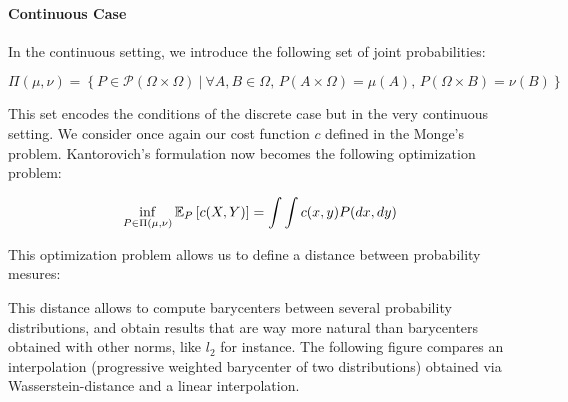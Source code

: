 \paragraph{Continuous Case}

In the continuous setting, we introduce the following set of joint probabilities:

$$ \Pi(\mu, \nu) = \left\{ P \in \mathcal{P}(\Omega \times \Omega)~|~\forall A, B \in \Omega, \, P(A \times \Omega) = \mu(A), \, P(\Omega \times B) = \nu(B) \right\} $$

This set encodes the conditions of the discrete case but in the very
continuous setting. We consider once again our cost function $c$ defined
in the Monge's problem. Kantorovich's formulation now becomes the following
optimization problem:

$$ \inf_{P \in \Pi(\mu, \nu)} \mathbb{E}_P \left[ c(X, Y) \right] = \int \int c(x, y) P(dx, dy) $$

This optimization problem allows us to define a distance between probability mesures:


This distance allows to compute barycenters between several probability
distributions, and obtain results that are way more natural than barycenters
obtained with other norms, like $l_2$ for instance. The following
figure compares an interpolation (progressive weighted barycenter of two
distributions) obtained via Wasserstein-distance and a linear interpolation.

